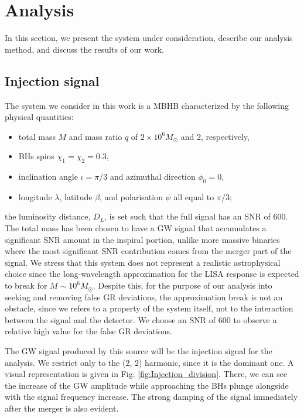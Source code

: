 \section{Analysis} 
In this section, we present the system under consideration, describe our analysis method, and discuss the results of our work.


\subsection{Injection signal}
\label{Injection_signal}

The system we consider in this work is a MBHB characterized by the following physical quantities:

\begin{itemize}
\item total mass $M$ and mass ratio $ q$ of $2 \times 10^6 M_\odot $ and 2, respectively,
\item BHs spins $\chi_1 = \chi_2 = 0.3$,
\item inclination angle $\iota = \pi/3$ and azimuthal direction $\phi_0 = 0$,
\item longitude $\lambda$, latitude $\beta$, and polarisation $\psi$ all equal to $\pi/3$;

\end{itemize}

the luminosity distance, $D_L$,  is set such that the full signal has an SNR of 600.
The total mass has been chosen to have a GW signal that accumulates a significant SNR amount in the inspiral portion, unlike more massive binaries where the most significant SNR contribution comes from the merger part of the signal. We stress that this system does not represent a realistic astrophysical choice since the long-wavelength approximation for the LISA response is expected to break for $ M \sim 10^6 M_\odot$. Despite this, for the purpose of our analysis into seeking and removing false GR deviations, the approximation break is not an obstacle, since we refers to a property of the system itself, not to the interaction between the signal and the detector. We choose an SNR of 600 to observe a relative high value for the false GR deviations.

The GW signal produced by this source will be the injection signal for the analysis. We restrict only to the (2, 2) harmonic, since it is the dominant one. A visual representation is given in Fig. \ref{fig:Injection_division}. There, we can see the increase of the GW amplitude while approaching the BHs plunge alongside with the signal frequency increase. The strong damping of the signal immediately after the merger is also evident.

